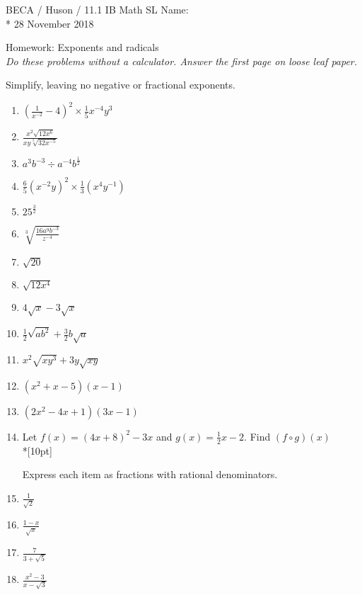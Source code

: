 \documentclass[]{book}
\begin{document}
\noindent BECA / Huson / 11.1 IB Math SL \hspace{2in} Name:\\*
28 November 2018
\begin{center}
{\Large Homework: Exponents and radicals}\\
\textit{Do these problems without a calculator. Answer the first page on loose leaf paper.}
\end{center}



Simplify, leaving no negative or fractional exponents.

\begin{enumerate}

\item $\displaystyle (\frac{1}{x^{-2}}-4)^2 \times \frac{1}{5}x^{-4} y^{3}$
\item $\displaystyle  \frac{x^2 \sqrt{12x^6}}{xy \sqrt[5]{32x^{-5}}}$
\item $a^3 b^{-3} \div a^{-4} b^{\frac{1}{2}}$
\item $\displaystyle \frac{6}{5} (x^{-2} y)^2 \times \frac{1}{3}(x^4 y^{-1})$
\item $\displaystyle  25^\frac{3}{2}$
\item $\displaystyle  \sqrt[3]{\frac{16a^9 b^{-3}}{z^{-4}}}$

\item $\sqrt{20}$
\item $\sqrt{12x^4}$

\item $4\sqrt{x}-3\sqrt{x}$
\item $\frac{1}{2}\sqrt{ab^2}+\frac{3}{2}b\sqrt{a}$
\item $x^2 \sqrt{xy^3}+3y\sqrt{xy}$

\item $(x^2+x-5)(x-1)$
\item $(2x^2-4x+1)(3x-1)$

\item Let $f(x) = (4x+8)^2 - 3x$ and $g(x)=\frac{1}{2}x-2$. Find $(f \circ g) (x)$\\*[10pt]

Express each item as fractions with rational denominators.
\item $\displaystyle   \frac{1}{\sqrt{2}}$
\item $\displaystyle  \frac{1-x}{\sqrt{x}}$
\item $\displaystyle  \frac{7}{3+\sqrt{5}}$
\item $\displaystyle  \frac{x^2-3}{x-\sqrt{3}}$


\end{enumerate}
\end{document}
